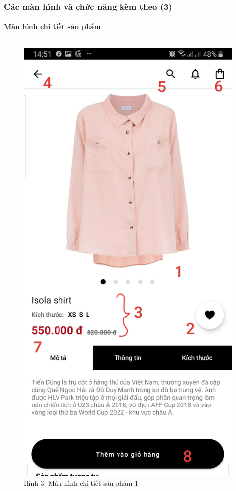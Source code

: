 \documentclass{beamer}
\begin{document}
\begin{frame}
    \frametitle{Các màn hình và chức năng kèm theo (3)}
    \framesubtitle{Màn hình chi tiết sản phẩm}

    \begin{columns}
        \begin{figure}
            \centering
            \includegraphics[height=0.7\textheight]{images/03.png}
            \caption{\centering\tiny{Hình 3: Màn hình chi tiết sản phẩm 1}}


\end{figure}
\end{columns}
\end{frame}
\end{document}
